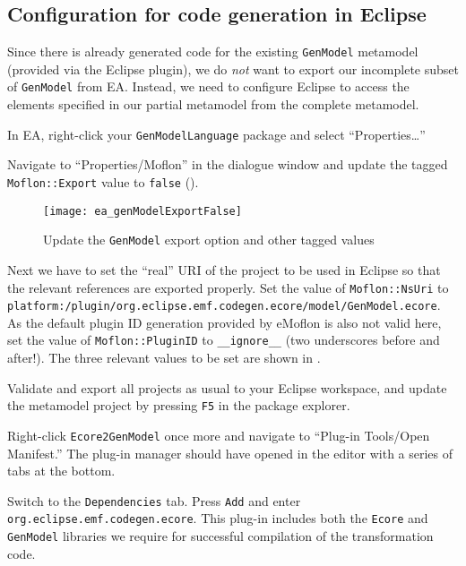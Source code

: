 \newpage

\subsection{Configuration for code generation in Eclipse}
\genHeader

Since there is already generated code for the existing \texttt{GenModel} metamodel (provided via the Eclipse plugin), we do \emph{not} want to export our
incomplete subset of \texttt{GenModel} from EA. Instead, we need to configure Eclipse to access the elements specified in our partial metamodel from the
complete metamodel.

\begin{stepbystep}

\item In EA, right-click your \texttt{GenModelLanguage} package and select ``Properties\ldots'' 

\item Navigate to ``Properties/Moflon'' in the dialogue window and update the tagged \texttt{Moflon::Export} value to \texttt{false}
().

\begin{figure}[htb]
\begin{center}  \texttt{[image: ea\_genModelExportFalse]}
  \caption{Update the \texttt{GenModel} export option and other tagged values}  
  \label{fig_customNS}
\end{center}
\end{figure}

\item Next we have to set the ``real'' URI of the project to be used in Eclipse so that the relevant references are exported
properly. Set the value of \texttt{Moflon::NsUri} to \texttt{platform:/\-plugin/\-org.\-eclipse.\-emf.codegen.ecore/\-model/\-GenModel.ecore}.
As the default plugin ID generation provided by eMoflon is also not valid here, set the value of \texttt{Moflon::PluginID} to \texttt{\_\_ignore\_\_} (two underscores before and after!).
The three relevant values to be set are shown in .

\item Validate and export all projects as usual to your Eclipse workspace, and update the metamodel project by pressing \texttt{F5} in
the package explorer.

\item Right-click \texttt{Ecore2GenModel} once more and navigate to ``Plug-in Tools/Open Manifest.'' The plug-in manager should have
opened in the editor with a series of tabs at the bottom.

\item Switch to the \texttt{Dependencies} tab. Press \texttt{Add} and enter \texttt{org.\-eclipse.\-emf.\-codegen.\-ecore}. This plug-in
includes both the \texttt{Ecore} and \texttt{Gen\-Mod\-el} libraries we require for successful compilation of the transformation code.

\end{stepbystep}

